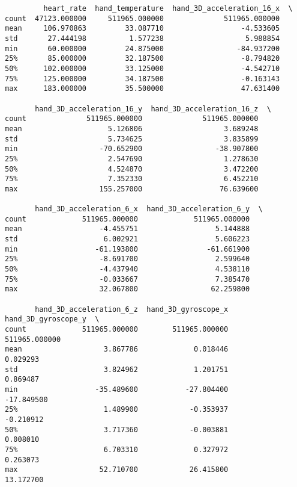 \documentclass[11pt]{article}
\begin{document}
    
    \begin{verbatim}
         heart_rate  hand_temperature  hand_3D_acceleration_16_x  \
count  47123.000000     511965.000000              511965.000000   
mean     106.970863         33.087710                  -4.533605   
std       27.444198          1.577238                   5.988854   
min       60.000000         24.875000                 -84.937200   
25%       85.000000         32.187500                  -8.794820   
50%      102.000000         33.125000                  -4.542710   
75%      125.000000         34.187500                  -0.163143   
max      183.000000         35.500000                  47.631400   

       hand_3D_acceleration_16_y  hand_3D_acceleration_16_z  \
count              511965.000000              511965.000000   
mean                    5.126806                   3.689248   
std                     5.734625                   3.835899   
min                   -70.652900                 -38.907800   
25%                     2.547690                   1.278630   
50%                     4.524870                   3.472200   
75%                     7.352330                   6.452210   
max                   155.257000                  76.639600   

       hand_3D_acceleration_6_x  hand_3D_acceleration_6_y  \
count             511965.000000             511965.000000   
mean                  -4.455751                  5.144888   
std                    6.002921                  5.606223   
min                  -61.193800                -61.661900   
25%                   -8.691700                  2.599640   
50%                   -4.437940                  4.538110   
75%                   -0.033667                  7.385470   
max                   32.067800                 62.259800   

       hand_3D_acceleration_6_z  hand_3D_gyroscope_x  hand_3D_gyroscope_y  \
count             511965.000000        511965.000000        511965.000000   
mean                   3.867786             0.018446             0.029293   
std                    3.824962             1.201751             0.869487   
min                  -35.489600           -27.804400           -17.849500   
25%                    1.489900            -0.353937            -0.210912   
50%                    3.717360            -0.003881             0.008010   
75%                    6.703310             0.327972             0.263073   
max                   52.710700            26.415800            13.172700   


\end{verbatim}
\end{document}
